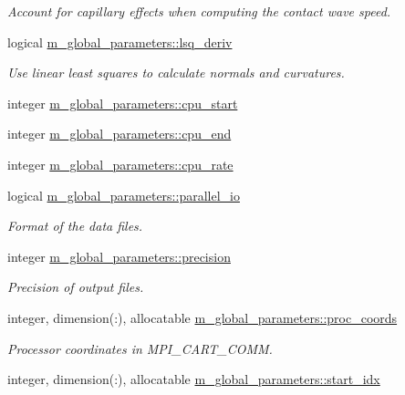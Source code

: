 \begin{DoxyCompactItemize}
\begin{DoxyCompactList}\small\item\em Account for capillary effects when computing the contact wave speed. \end{DoxyCompactList}\item 
logical \hyperlink{namespacem__global__parameters_ad367bbe26f93b9fd058c58ec11337fdf}{m\+\_\+global\+\_\+parameters\+::lsq\+\_\+deriv}
\begin{DoxyCompactList}\small\item\em Use linear least squares to calculate normals and curvatures. \end{DoxyCompactList}\item 
integer \hyperlink{namespacem__global__parameters_a5422a3820409740b5c3b0b2e88bdb2b0}{m\+\_\+global\+\_\+parameters\+::cpu\+\_\+start}
\item 
integer \hyperlink{namespacem__global__parameters_a8ed3dee47bbaa5de7ae564ca9d770404}{m\+\_\+global\+\_\+parameters\+::cpu\+\_\+end}
\item 
integer \hyperlink{namespacem__global__parameters_aa513ad8900dd8de41a5bd8a17e7943c7}{m\+\_\+global\+\_\+parameters\+::cpu\+\_\+rate}
\item 
logical \hyperlink{namespacem__global__parameters_ac127ac2a9036e1cdb7e6c41159cacdfb}{m\+\_\+global\+\_\+parameters\+::parallel\+\_\+io}
\begin{DoxyCompactList}\small\item\em Format of the data files. \end{DoxyCompactList}\item 
integer \hyperlink{namespacem__global__parameters_a6ed5e5561c16f30a4010f6612877029d}{m\+\_\+global\+\_\+parameters\+::precision}
\begin{DoxyCompactList}\small\item\em Precision of output files. \end{DoxyCompactList}\item 
integer, dimension(\+:), allocatable \hyperlink{namespacem__global__parameters_a48dea2bc17c5e4465a444c926070ae9b}{m\+\_\+global\+\_\+parameters\+::proc\+\_\+coords}
\begin{DoxyCompactList}\small\item\em Processor coordinates in M\+P\+I\+\_\+\+C\+A\+R\+T\+\_\+\+C\+O\+MM. \end{DoxyCompactList}\item 
integer, dimension(\+:), allocatable \hyperlink{namespacem__global__parameters_a4bd117ae744eab60f3d681fd03d6e90d}{m\+\_\+global\+\_\+parameters\+::start\+\_\+idx}

\end{DoxyCompactItemize}
